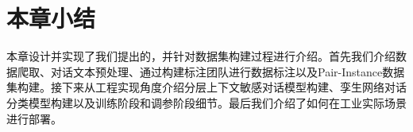 \section{本章小结}

本章设计并实现了我们提出的{\tool}，并针对数据集构建过程进行介绍。首先我们介绍数据爬取、对话文本预处理、通过构建标注团队进行数据标注以及Pair-Instance数据集构建。接下来从工程实现角度介绍分层上下文敏感对话模型构建、孪生网络对话分类模型构建以及训练阶段和调参阶段细节。最后我们介绍了{\tool}如何在工业实际场景进行部署。